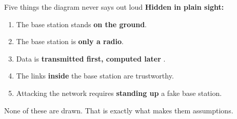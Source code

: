 \begin{frame}{Five things the diagram never says out loud}
  \large\textbf{Hidden in plain sight:}

  \vspace{0.7em}
  \normalsize
  \begin{enumerate}\itemsep8pt
    \item The base station stands \textbf{on the ground}.
    \item The base station is \textbf{only a radio}.
    \item Data is \textbf{transmitted first, computed later}
      {\scriptsize{}}.
    \item The links \textbf{inside} the base station are trustworthy.
    \item Attacking the network requires \textbf{standing up} a fake base station.
  \end{enumerate}

  \vspace{0.6em}
  \small
  None of these are drawn. That is exactly what makes them assumptions.

  \vspace{0.4em}
\end{frame}

